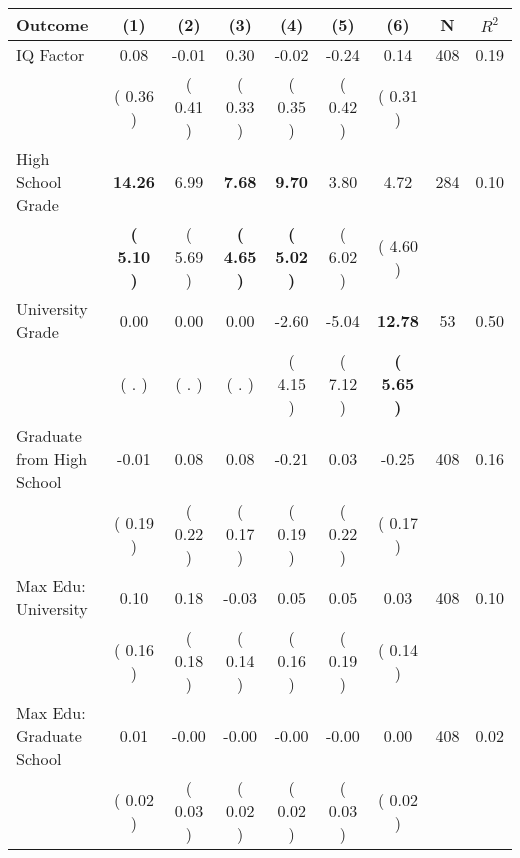 \begin{tabular}{lcccccccc}
\toprule
 \textbf{Outcome} & \textbf{(1)} & \textbf{(2)} & \textbf{(3)} & \textbf{(4)} & \textbf{(5)} & \textbf{(6)} & \textbf{N} & \textbf{$ R^2$} \\
\midrule
IQ Factor &      0.08 &     -0.01 &      0.30 &     -0.02 &     -0.24 &      0.14 & 408 &       0.19 \\ 
 & (     0.36 ) & (     0.41 ) & (     0.33 ) & (     0.35 ) & (     0.42 ) & (     0.31 ) & \\
High School Grade & \textbf{    14.26} &      6.99 & \textbf{     7.68} & \textbf{     9.70} &      3.80 &      4.72 & 284 &       0.10 \\ 
 & \textbf{(     5.10 )} & (     5.69 ) & \textbf{(     4.65 )} & \textbf{(     5.02 )} & (     6.02 ) & (     4.60 ) & \\
University Grade &      0.00 &      0.00 &      0.00 &     -2.60 &     -5.04 & \textbf{    12.78} & 53 &       0.50 \\ 
 & (        . ) & (        . ) & (        . ) & (     4.15 ) & (     7.12 ) & \textbf{(     5.65 )} & \\
Graduate from High School &     -0.01 &      0.08 &      0.08 &     -0.21 &      0.03 &     -0.25 & 408 &       0.16 \\ 
 & (     0.19 ) & (     0.22 ) & (     0.17 ) & (     0.19 ) & (     0.22 ) & (     0.17 ) & \\
Max Edu: University &      0.10 &      0.18 &     -0.03 &      0.05 &      0.05 &      0.03 & 408 &       0.10 \\ 
 & (     0.16 ) & (     0.18 ) & (     0.14 ) & (     0.16 ) & (     0.19 ) & (     0.14 ) & \\
Max Edu: Graduate School &      0.01 &     -0.00 &     -0.00 &     -0.00 &     -0.00 &      0.00 & 408 &       0.02 \\ 
 & (     0.02 ) & (     0.03 ) & (     0.02 ) & (     0.02 ) & (     0.03 ) & (     0.02 ) & \\
\bottomrule
\end{tabular}
